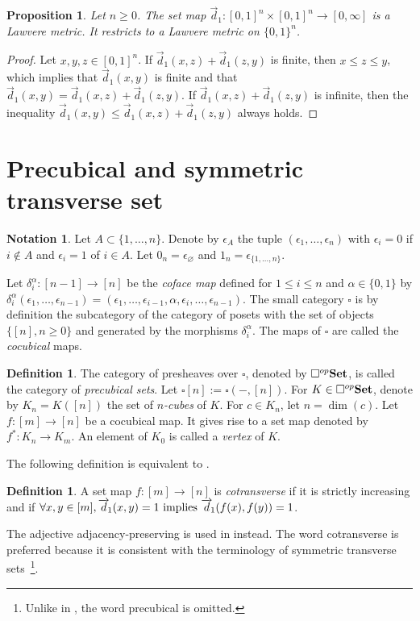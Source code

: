 \documentclass[a4paper,12pt]{amsart}
\newcommand{\p}{\times}
\renewcommand{\vec}{\overrightarrow}
\newtheorem{prop}[thm]{Proposition}
\newcommand{\bp}{\begin{prop}}
\newcommand{\ep}{\end{prop}}
\newcommand{\bpf}{\begin{proof}}
\newcommand{\epf}{\end{proof}}
\theoremstyle{definition}
\newtheorem{defn}[thm]{Definition}
\newcommand{\bd}{\begin{defn}}
\newcommand{\ed}{\end{defn}}
\newtheorem{nota}[thm]{Notation}
\renewcommand{\leq}{\leqslant}
\renewcommand{\geq}{\geqslant}
\newcommand{\brm}[1]{{\rm{\mathbf{#1}}}}
\newcommand{\set}{{\brm{Set}}}
\newcommand{\vd}{\vec{d}\!_1}
\begin{document}
\bp
Let $n\geq 0$. The set map $\vd:[0,1]^n\p [0,1]^n\to [0,\infty]$ is a Lawvere metric. It restricts to a Lawvere metric on $\{0,1\}^n$.
\ep

\bpf
Let $x,y,z\in [0,1]^n$. If $\vd(x,z)+\vd(z,y)$ is finite, then $x\leq z\leq y$, which implies that $\vd(x,y)$ is finite and that $\vd(x,y)=\vd(x,z)+\vd(z,y)$. If $\vd(x,z)+\vd(z,y)$ is infinite, then the inequality $\vd(x,y)\leq \vd(x,z)+\vd(z,y)$ always holds.
\epf



\section{Precubical and symmetric transverse set}
\label{precubical-transverse}


\begin{nota}
	Let $A\subset \{1,\dots,n\}$. Denote by $\epsilon_A$ the tuple $(\epsilon_1,\dots,\epsilon_n)$ with $\epsilon_i=0$ if $i\notin A$ and $\epsilon_i=1$ of $i\in A$. Let $0_n=\epsilon_\varnothing$ and $1_n=\epsilon_{\{1,\dots,n\}}$.
\end{nota}

Let $\delta_i^\alpha : [n-1] \rightarrow [n]$ be the \textit{coface map} defined for $1\leq i\leq n$ and $\alpha \in \{0,1\}$ by $\delta_i^\alpha(\epsilon_1, \dots, \epsilon_{n-1}) = (\epsilon_1,\dots, \epsilon_{i-1}, \alpha, \epsilon_i, \dots, \epsilon_{n-1})$. The small category $\square$ is by definition the subcategory of the category of posets with the set of objects $\{[n],n\geq 0\}$ and generated by the morphisms $\delta_i^\alpha$. The maps of $\square$ are called the \textit{cocubical} maps. 

\bd \cite{Brown_cube} The category of presheaves over $\square$, denoted by $\square^{op}\set$, is called the category of \textit{precubical sets}. Let $\square[n]:=\square(-,[n])$.  For $K\in \square^{op}\set$, denote by  $K_n=K([n])$ the set of \textit{$n$-cubes} of $K$.  For $c\in K_n$, let $n=\dim(c)$. Let $f:[m]\to [n]$ be a cocubical map. It gives rise to a set map denoted by $f^*:K_n\to K_m$. An element of $K_0$ is called a \textit{vertex} of $K$. \ed


The following definition is equivalent to \cite[Definition~2.1.5]{symcub}. 

\bd \label{cotransverse} A set map $f:[m] \rightarrow [n]$ is \textit{cotransverse} if it is strictly increasing and if $\forall x,y\in [m], \vd(x,y)=1 \hbox{ implies }\vd(f(x),f(y)) = 1$.
\ed

The adjective adjacency-preserving is used in \cite{symcub} instead. The word cotransverse is preferred because it is consistent with the terminology of symmetric transverse sets~\footnote{Unlike in \cite{symcub}, the word precubical is omitted.}.
\end{document}
